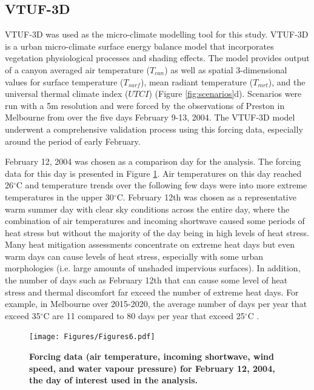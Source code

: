 \documentclass[final,3p,times,authoryear]{elsarticle}
\begin{document}
\subsection{VTUF-3D}\label{sec:methodsvtuf}
VTUF-3D \citep{Nice2018a} was used as the micro-climate modelling tool for this study. VTUF-3D is a urban micro-climate surface energy balance model that incorporates vegetation physiological processes and shading effects. The model provides output of a canyon averaged air temperature ($T_{can}$) as well as spatial 3-dimensional values for surface temperature ($T_{surf}$), mean radiant temperature ($T_{mrt}$), and the universal thermal climate index ($UTCI$) (Figure \ref{fig:scenarios}d). Scenarios were run with a 5m resolution and were forced by the observations of Preston in Melbourne from \cite{Coutts2007} over the five days February 9-13, 2004. The VTUF-3D model underwent a comprehensive validation process \citep{Nice2016,Nice2018a} using this forcing data, especially around the period of early February.

February 12, 2004 was chosen as a comparison day for the analysis. The forcing data for this day is presented in Figure \ref{fig:forcing}. Air temperatures on this day reached 26$^{\circ}$C and temperature trends over the following few days were into more extreme temperatures in the upper 30$^{\circ}$C. February 12th was chosen as a representative warm summer day with clear sky conditions across the entire day, where the combination of air temperatures and incoming shortwave caused some periods of heat stress but without the majority of the day being in high levels of heat stress. Many heat mitigation assessments concentrate on extreme heat days but even warm days can cause levels of heat stress, especially with some urban morphologies (i.e. large amounts of unshaded impervious surfaces). In addition, the number of days such as February 12th that can cause some level of heat stress and thermal discomfort far exceed the number of extreme heat days. For example, in Melbourne over 2015-2020, the average number of days per year that exceed 35$^{\circ}$C are 11 compared to 80 days per year that exceed 25$^{\circ}$C \citep{BureauofMeteorology2021}.

\begin{figure}
\centering
\texttt{[image: Figures/Figures6.pdf]}
\caption{\bf Forcing data (air temperature, incoming shortwave, wind speed, and water vapour pressure) for February 12, 2004, the day of interest used in the analysis.}
 \label{fig:forcing}
\end{figure} 
\end{document}
